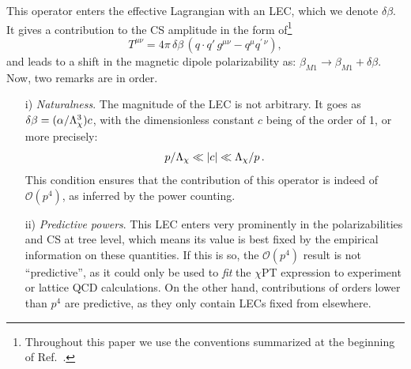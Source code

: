 \documentclass[12pt,preprint,tightenlines,
showpacs,preprintnumbers,amsmath,amssymb,
a4paper,nofootinbib]{revtex4-2}
\def\beq{\begin{equation}}
\def\eeq{\end{equation}}
\def\eqlab#1{\label{eq:#1}}
\def\al{\alpha}
\def\be{\beta}
\def\de{\delta} \def\De{\Delta}
\begin{document}
This operator enters the effective Lagrangian with an LEC, which we denote $\de \be$.
It gives a contribution to the CS amplitude in the form of\footnote{
Throughout this paper we use the conventions summarized at the beginning of Ref.~\cite{Hagelstein:2015egb}.}
\beq 
T^{\mu\nu} = 4\pi \, \de \be \, (q\cdot q' \, g^{\mu\nu} - q^\mu q^{\prime\,\nu}),
\eqlab{eq:deltabetaamp}
\eeq 
and leads to a shift in the magnetic dipole polarizability as: $\be_{M1}\to \be_{M1}+\de\be $.
Now, two remarks are in order.
\begin{itemize}
\item[i)] {\em Naturalness}. The magnitude of the LEC is not arbitrary. It goes as 
${\de \be = (\al/\La_\chi^3) c} $, with the dimensionless constant $c$ being of the order of 1, or more precisely:
\beq 
p/\La_\chi \ll |c|\ll \La_\chi/p\,.
\eeq 
This condition ensures that the contribution  of this operator is indeed 
of $\mathcal{O}(p^4)$, as inferred by the power counting.
\item[ii)] {\em Predictive powers}.
This LEC enters very prominently in the polarizabilities and CS  at tree level,
which means its value is best fixed by the empirical information on these quantities. 
If this is so, the $\mathcal{O}(p^4)$ result is not ``predictive'', as it could only be used to {\em fit} 
the $\chi$PT expression to experiment or lattice QCD calculations. On the other hand, contributions
of orders lower than $p^4$ are predictive, as they only contain LECs fixed from elsewhere.
\end{itemize}
\end{document}

